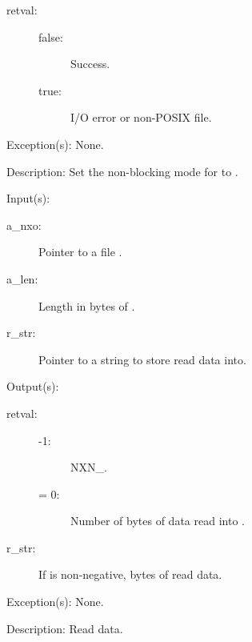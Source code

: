 \begin{capi}
\begin{capilist}
		\begin{description}\item[]
		\item[retval: ]
			\begin{description}\item[]
			\item[false: ]
				Success.
			\item[true: ]
				I/O error or non-POSIX file.
			\end{description}
		\end{description}
	\item[Exception(s): ] None.
	\item[Description: ]
		Set the non-blocking mode for  to
		.
	\end{capilist}
\label{nxo_file_read}
	\begin{capilist}
	\item[Input(s): ]
		\begin{description}\item[]
		\item[a\_nxo: ]
			Pointer to a file .
		\item[a\_len: ]
			Length in bytes of .
		\item[r\_str: ]
			Pointer to a string to store read data into.
		\end{description}
	\item[Output(s): ]
		\begin{description}\item[]
		\item[retval: ]
			\begin{description}\item[]
			\item[-1: ]
				NXN\_.
			\item[{\gt}= 0: ]
				Number of bytes of data read into .
			\end{description}\item[]
		\item[r\_str: ]
			If  is non-negative,  bytes of
			read data.
		\end{description}
	\item[Exception(s): ] None.
	\item[Description: ]
		Read data.
	\end{capilist}

\end{capi}
